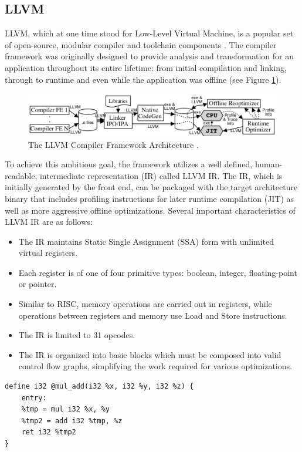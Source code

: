 \subsection{LLVM}
\label{sec:llvm}
LLVM, which at one time stood for Low-Level Virtual Machine, is a popular set of open-source, modular compiler and toolchain components \cite{lattner2004llvm}.
The compiler framework was originally designed to provide analysis and transformation for an application throughout its entire lifetime: from initial compilation and linking, through to runtime and even while the application was offline (see Figure \ref{fig:llvmarch}).
\begin{figure}
    \includegraphics[width=\textwidth]{images/llvm-architecture.png}
    \caption{ The LLVM Compiler Framework Architecture \cite{lattner2004llvm}.}
    \label{fig:llvmarch}
    \Description[]{}
\end{figure}
To achieve this ambitious goal, the framework utilizes a well defined, human-readable, intermediate representation (IR) called LLVM IR.
The IR, which is initially generated by the front end, can be packaged with the target architecture binary that includes profiling instructions for later runtime compilation (JIT) as well as more aggressive offline optimizations.
Several important characteristics of LLVM IR are as follows:
\begin{itemize}
    \item The IR maintains Static Single Assignment (SSA) form with unlimited virtual registers.
    \item Each register is of one of four primitive types: boolean, integer, floating-point or pointer.
    \item Similar to RISC, memory operations are carried out in registers, while operations between registers and memory use Load and Store instructions.
    \item The IR is limited to 31 opcodes.
    \item The IR is organized into basic blocks which must be composed into valid control flow graphs, simplifying the work required for various optimizations. 
\end{itemize}

\begin{lstlisting}[float,floatplacement=H,
caption={LLVM IR for a function returning x * y + z \cite{LLVM_Jit_Tutorial}.},
label=lst:llvm_ir]
define i32 @mul_add(i32 %x, i32 %y, i32 %z) {
    entry:
    %tmp = mul i32 %x, %y
    %tmp2 = add i32 %tmp, %z
    ret i32 %tmp2
}\end{lstlisting}

